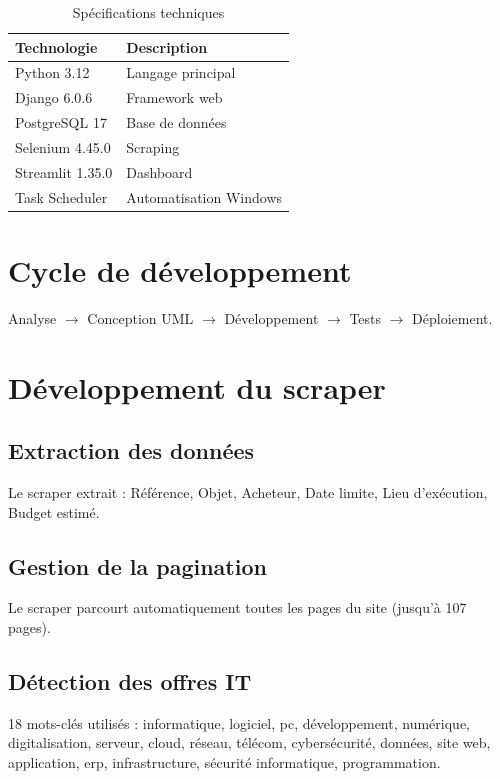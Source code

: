 \documentclass[12pt,a4paper]{report}
\begin{document}
\begin{table}[h]
\centering
\begin{tabular}{|l|l|}
\hline
\textbf{Technologie} & \textbf{Description} \\
\hline
Python 3.12 & Langage principal \\
Django 6.0.6 & Framework web \\
PostgreSQL 17 & Base de données \\
Selenium 4.45.0 & Scraping \\
Streamlit 1.35.0 & Dashboard \\
Task Scheduler & Automatisation Windows \\
\hline
\end{tabular}
\caption{Spécifications techniques}
\label{tab:stack}
\end{table}

\section{Cycle de développement}

Analyse $\rightarrow$ Conception UML $\rightarrow$ Développement $\rightarrow$ Tests $\rightarrow$ Déploiement.

\section{Développement du scraper}

\subsection{Extraction des données}

Le scraper extrait : Référence, Objet, Acheteur, Date limite, Lieu d'exécution, Budget estimé.

\subsection{Gestion de la pagination}

Le scraper parcourt automatiquement toutes les pages du site (jusqu'à 107 pages).

\subsection{Détection des offres IT}

18 mots-clés utilisés : informatique, logiciel, pc, développement, numérique, digitalisation, serveur, cloud, réseau, télécom, cybersécurité, données, site web, application, erp, infrastructure, sécurité informatique, programmation.
\end{document}

